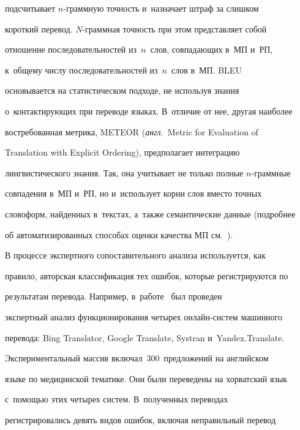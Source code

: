подсчитывает $n$-грам\-мную точ\-ность и~назначает штраф за слишком 


короткий перевод. $N$-грам\-мная точ\-ность при этом представляет собой 


отношение последовательностей из~$n$~слов, совпа\-да\-ющих в~МП и~РП, 


к~общему чис\-лу последовательностей из~$n$~слов в~МП. BLEU 


основывается на статистическом подходе, не используя знания 


о~кон\-так\-ти\-ру\-ющих при переводе языках. В~отличие от нее, другая наиболее 


востребованная мет\-ри\-ка, METEOR (\textit{англ.}\ Metric for Evaluation of 


Translation with Explicit Ordering), предполагает интеграцию 


лингвистического знания. Так, она учитывает не только полные $n$-граммные 


совпадения в~МП и~РП, но и~использует корни слов вмес\-то точных 


словоформ, найденных в~текс\-тах, а~также семантические данные (подробнее 


об автоматизированных способах оценки качества МП см.~\cite{1-ez, 2-ez, 3-ez, 4-ez}).


{





}


   


   В процессе экспертного сопоставительного анализа используется, как 


правило, авторская классификация тех ошибок, которые регистрируются по 


результатам перевода. Например, в~работе~\cite{5-ez} был проведен 


экспертный анализ функционирования четырех он\-лайн-сис\-тем машинного 


перевода: Bing Translator, Google Translate, Systran и~Yandex.Translate. 


Экспериментальный массив вклю\-чал~300~предложений на английском 


языке по медицинской тематике. Они были переведены на хорватский язык 


с~по\-мощью этих четырех сис\-тем. В~полученных переводах 


регистрировались девять видов ошибок, вклю\-чая неправильный перевод 


